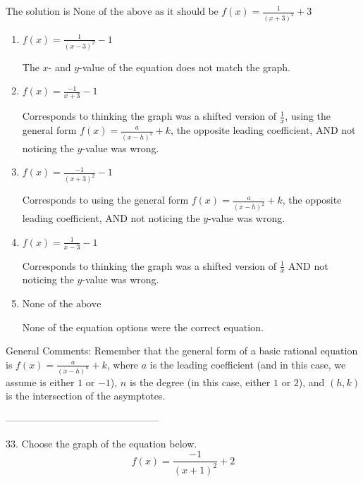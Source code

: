 \documentclass{article}[14pt]
\begin{document}
The solution is $ \text{None of the above as it should be } f(x) = \frac{1}{(x + 3)^2} + 3 $ 

\begin{enumerate}[label=\Alph*.] 
\item $ f(x) = \frac{1}{(x - 3)^2} - 1 $ 

 The $x$- and $y$-value of the equation does not match the graph. 
\item $ f(x) = \frac{-1}{x + 3} - 1 $ 

 Corresponds to thinking the graph was a shifted version of $\frac{1}{x}$, using the general form $f(x) = \frac{a}{(x-h)^2}+k$, the opposite leading coefficient, AND not noticing the $y$-value was wrong. 
\item $ f(x) = \frac{-1}{(x + 3)^2} - 1 $ 

 Corresponds to using the general form $f(x) = \frac{a}{(x-h)^2}+k$, the opposite leading coefficient, AND not noticing the $y$-value was wrong. 
\item $ f(x) = \frac{1}{x - 3} - 1 $ 

 Corresponds to thinking the graph was a shifted version of $\frac{1}{x}$ AND not noticing the $y$-value was wrong. 
\item $ \text{None of the above} $ 

 None of the equation options were the correct equation. 
\end{enumerate} 
 
General Comments: Remember that the general form of a basic rational equation is $ f(x) = \frac{a}{(x-h)^n} + k$, where $a$ is the leading coefficient (and in this case, we assume is either $1$ or $-1$), $n$ is the degree (in this case, either $1$ or $2$), and $(h, k)$ is the intersection of the asymptotes.

-----------------------------------------------

33. Choose the graph of the equation below.
$$ f(x) = \frac{-1}{(x + 1)^2} + 2 $$ 
\end{document}
